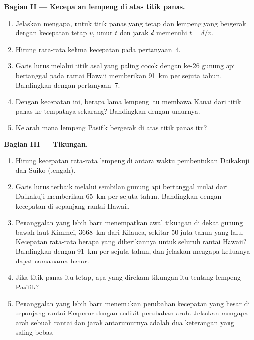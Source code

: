 \begin{problem}
\medskip
\noindent\textbf{Bagian II --- Kecepatan lempeng di atas titik panas.}
\begin{enumerate}[resume]
  \item Jelaskan mengapa, untuk titik panas yang tetap dan lempeng yang bergerak
        dengan kecepatan tetap $v$, umur $t$ dan jarak $d$ memenuhi $t = d/v$.
  \item Hitung rata-rata kelima kecepatan pada pertanyaan~4.
  \item Garis lurus melalui titik asal yang paling cocok dengan ke-26 gunung
        api bertanggal pada rantai Hawaii memberikan \qty{91}{km} per sejuta
        tahun. Bandingkan dengan pertanyaan~7.
  \item Dengan kecepatan ini, berapa lama lempeng itu membawa Kauai dari titik
        panas ke tempatnya sekarang? Bandingkan dengan umurnya.
  \item Ke arah mana lempeng Pasifik bergerak di atas titik panas itu?
\end{enumerate}

\medskip
\noindent\textbf{Bagian III --- Tikungan.}
\begin{enumerate}[resume]
  \item Hitung kecepatan rata-rata lempeng di antara waktu pembentukan Daikakuji
        dan Suiko (tengah).
  \item Garis lurus terbaik melalui sembilan gunung api bertanggal mulai dari
        Daikakuji memberikan \qty{65}{km} per sejuta tahun. Bandingkan dengan
        kecepatan di sepanjang rantai Hawaii.
  \item Penanggalan yang lebih baru menempatkan awal tikungan di dekat gunung
        bawah laut Kimmei, \qty{3668}{km} dari Kilauea, sekitar 50 juta tahun
        yang lalu. Kecepatan rata-rata berapa yang diberikannya untuk seluruh
        rantai Hawaii? Bandingkan dengan \qty{91}{km} per sejuta tahun, dan
        jelaskan mengapa keduanya dapat sama-sama benar.
  \item Jika titik panas itu tetap, apa yang direkam tikungan itu tentang
        lempeng Pasifik?
  \item Penanggalan yang lebih baru menemukan perubahan kecepatan yang besar di
        sepanjang rantai Emperor dengan sedikit perubahan arah. Jelaskan mengapa
        arah sebuah rantai dan jarak antarumurnya adalah dua keterangan yang
        saling bebas.
\end{enumerate}


\end{problem}
